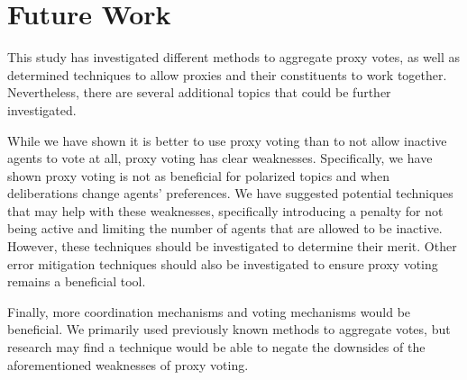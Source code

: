 \section{Future Work}\label{sec:future-work}
This study has investigated different methods to aggregate proxy votes, as well as
determined techniques to allow proxies and their constituents to work together.
Nevertheless, there are several additional topics that could be further investigated.

While we have shown it is better to use proxy voting than to not allow
inactive agents to vote at all, proxy voting has clear weaknesses.
Specifically, we have shown proxy voting is not as beneficial for polarized
topics and when deliberations change agents' preferences.
We have suggested potential techniques that may help with these weaknesses,
specifically introducing a penalty for not being active and limiting the number of
agents that are allowed to be inactive.
However, these techniques should be investigated to determine their merit.
Other error mitigation techniques should also be investigated to ensure proxy voting
remains a beneficial tool.

Finally, more coordination mechanisms and voting mechanisms would be beneficial.
We primarily used previously known methods to aggregate votes, but research may
find a technique would be able to negate the downsides of the aforementioned
weaknesses of proxy voting.
